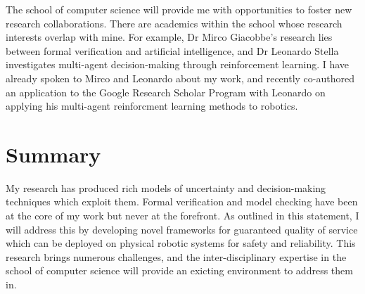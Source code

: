 \documentclass[12pt]{article}
\begin{document}
The school of computer science will provide me with opportunities to foster new research collaborations.
%
There are academics within the school whose research interests overlap with mine.
%
For example, Dr Mirco Giacobbe's research lies between formal verification and artificial intelligence, and Dr Leonardo Stella investigates multi-agent decision-making through reinforcement learning.
%
I have already spoken to Mirco and Leonardo about my work, and recently co-authored an application to the Google Research Scholar Program with Leonardo on applying his multi-agent reinforcment learning methods to robotics.


\section*{Summary}

My research has produced rich models of uncertainty and decision-making techniques which exploit them.
%
Formal verification and model checking have been at the core of my work but never at the forefront.
%
As outlined in this statement, I will address this by developing novel frameworks for guaranteed quality of service which can be deployed on physical robotic systems for safety and reliability.
%
This research brings numerous challenges, and the inter-disciplinary expertise in the school of computer science will provide an exicting environment to address them in.
\end{document}

